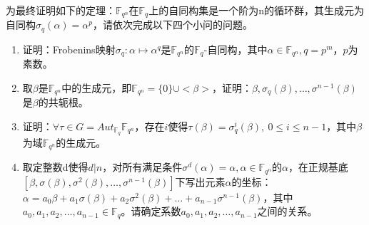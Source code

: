 为最终证明如下的定理：$\mathbb{F}_{q^n}$在$\mathbb{F}_{q}$上的自同构集是一个阶为n的循环群，其生成元为自同构$\sigma_q(\alpha)=\alpha^p$，请依次完成以下四个小问的问题。
\begin{enumerate}
    \item 证明：Frobenins映射$\sigma_q:\alpha\mapsto\alpha^q$是$\mathbb{F}_{q^n}$的$\mathbb{F}_{q}$-自同构，其中$\alpha\in\mathbb{F}_{q^n}, q=p^m$，$p$为素数。
    


    \item 取$\beta$是$\mathbb{F}_{q^n}$中的生成元，即$\mathbb{F}_{q^n}=\{0\}\cup<\beta>$，证明：$\beta,\sigma_q(\beta),\dots,\sigma^{n-1}(\beta)$是$\beta$的共轭根。
    

    \item 证明：$\forall\tau\in G=Aut_{\mathbb{F}_{q}}{\mathbb{F}_{q^n}}$，存在$i$使得$\tau(\beta)=\sigma_q^i(\beta),\ 0\leq i\leq n-1$，其中$\beta$为域$\mathbb{F}_{q^n}$的生成元。
    

    \item 取定整数d使得$d|n$，对所有满足条件$\sigma^d(\alpha)=\alpha, \alpha\in\mathbb{F}_{q^n}$的$\alpha$，在正规基底$[\beta,\sigma(\beta),\sigma^2(\beta),\dots,\sigma^{n-1}(\beta)]$下写出元素$\alpha$的坐标：$\alpha=a_0\beta+a_1\sigma(\beta)+a_2\sigma^2(\beta)+\dots+a_{n-1}\sigma^{n-1}(\beta)$，其中$a_0,a_1,a_2,\dots,a_{n-1}\in\mathbb{F}_{q}$。请确定系数$a_0,a_1,a_2,\dots,a_{n-1}$之间的关系。
    
\end{enumerate}